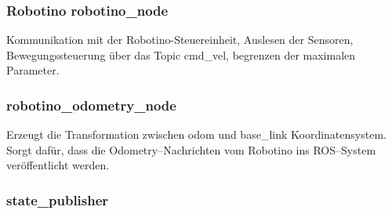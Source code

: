\subsubsection{Robotino robotino\_node}

Kommunikation mit der Robotino-Steuereinheit, Auslesen der Sensoren, Bewegungssteuerung über das Topic cmd\_vel, begrenzen der maximalen Parameter.


\begin{comment}
--------------------------------------------------------------------------------

odometry_pub_ = nh_.advertise<nav_msgs::Odometry>("odom", 1, true);

Transformation: odom <- base_link
odometry_transform_broadcaster_.sendTransform( odometry_transform_ );

reset_odometry_server_ = nh_.advertiseService("reset_odometry",
			&OdometryROS::resetOdometryCallback, this);
			
<node name="robotino_odometry_node" pkg="robotino_node" type="robotino_odometry_node" output="screen">
	<param name="hostname" value="$(arg hostname)" />
</node>
\end{comment}
\subsubsection{robotino\_odometry\_node}

Erzeugt die Transformation zwischen odom und base\_link Koordinatensystem.
Sorgt dafür, dass die Odometry--Nachrichten vom Robotino ins ROS--System veröffentlicht werden.



\begin{comment}
--------------------------------------------------------------------------------
<param name="robot_description" textfile="$(find robotino_description)/urdf/robotino.urdf" />
<node pkg="robot_state_publisher" type="state_publisher" name="robot_state_publisher" output="screen">
	<param name="publish_frequency" type="double" value="20.0" />
</node>

- Bild von dem Robotino + TF Tree
\end{comment}
\subsubsection{state\_publisher}




